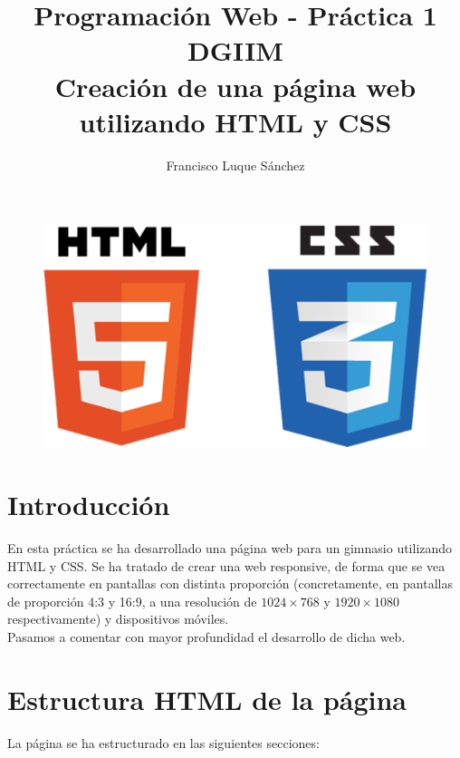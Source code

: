 \documentclass[11pt]{article}
\theoremstyle{plain}
\theoremstyle{definition}
\begin{document}
\title{Programación Web - Práctica 1\\
  DGIIM \\
  \large Creación de una página web utilizando HTML y CSS}
\author{Francisco Luque Sánchez}
\maketitle

\begin{figure}[H]
  \centering
  \includegraphics[width=.3\textwidth]{html_css.png}
\end{figure}


\section{Introducción}

En esta práctica se ha desarrollado una página web para un gimnasio
utilizando HTML y CSS. Se ha tratado de crear una web responsive, de
forma que se vea correctamente en pantallas con distinta proporción
(concretamente, en pantallas de proporción 4:3 y 16:9, a una
resolución de $1024 \times 768$ y $1920 \times 1080$ respectivamente)
y dispositivos móviles.\\

Pasamos a comentar con mayor profundidad el desarrollo de dicha web.

\section{Estructura HTML de la página}

La página se ha estructurado en las siguientes secciones:
\end{document}

